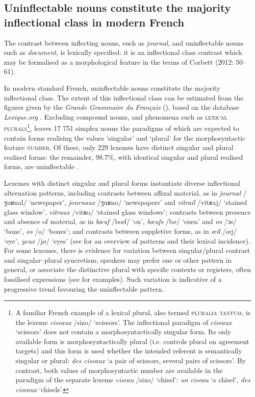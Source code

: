 \documentclass[output=paper]{langscibook}
\begin{document}
\subsection{Uninflectable nouns constitute the majority inflectional class in modern French}  %

The contrast between inflecting nouns, such as \textit{journal}, and uninflectable nouns such as \textit{document}, is lexically specified: it is an inflectional class contrast which may be formalised as a morphological feature in the terms of Corbett (2012: 50–61).

In modern standard French, uninflectable nouns constitute the majority inflectional class. The extent of this inflectional class can be estimated from the figures given by the \textit{Grande Grammaire du Français} (\citealt{AbeilléGodard2021}), based on the database \textit{Lexique.org} \citep{NewEtAl2004}. Excluding compound nouns, and phenomena such as \textsc{lexical} \textsc{plurals}\footnote{A familiar French example of a lexical plural, also termed \textsc{pluralia} \textsc{tantum}, is the lexeme \textit{ciseaux} /sizo/ ‘scissors’. The inflectional paradigm of \textit{ciseaux} ‘scissors’ does not contain a morphosyntactically singular form. Its only available form is morphosyntactically plural (i.e. controls plural on agreement targets) and this form is used whether the intended referent is semantically singular or plural: \textit{des ciseaux} ‘a pair of scissors, several pairs of scissors’. By contrast, both values of morphosyntactic number are available in the paradigm of the separate lexeme \textit{ciseau} /sizo/ ‘chisel’: \textit{un ciseau} ‘a chisel’, \textit{des ciseaux} ‘chisels’.}\citep{Acquaviva2008}, leaves 17 751 simplex nouns the paradigms of which are expected to contain forms realising the values ‘singular’ and ‘plural’ for the morphosyntactic feature \textsc{number}. Of these, only 229 lexemes have distinct singular and plural realised forms: the remainder, 98.7\%, with identical singular and plural realised forms, are uninflectable \citep{AbeilléEtAl2021}.

Lexemes with distinct singular and plural forms instantiate diverse inflectional alternation patterns, including contrasts between affixal material, as in \textit{journal} /ʒuʁnal/ ‘newspaper’, \textit{journaux} /ʒuʁno/ ‘newspapers’ and \textit{vitrail} /vitʁaj/ ‘stained glass window’, \textit{vitraux} /vitʁo/ ‘stained glass windows’; contrasts between presence and absence of material, as in \textit{bœuf} /bœf/ ‘ox’, \textit{bœufs} /bø/ ‘oxen’ and \textit{os} /ɔs/ ‘bone’, \textit{os} /o/ ‘bones’; and contrasts between suppletive forms, as in \textit{œil} /œj/ ‘eye’, \textit{yeux} /jø/ ‘eyes’ (see \citealt{AbeilléEtAl2021} for an overview of patterns and their lexical incidence). For some lexemes, there is evidence for variation between singular/plural contrast and singular–plural syncretism; speakers may prefer one or other pattern in general, or associate the distinctive plural with specific contexts or registers, often fossilised expressions (see \citealt{AbeilléEtAl2021} for examples). Such variation is indicative of a progressive trend favouring the uninflectable pattern.
\end{document}
